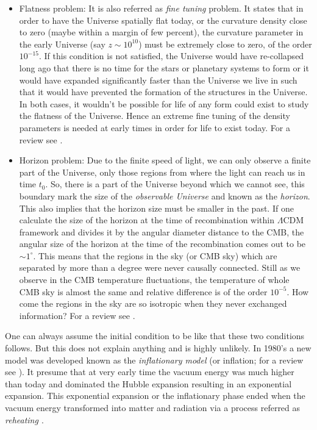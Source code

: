 \begin{itemize}
	\item Flatness problem: It is also referred as {\it fine tuning} problem. It 
				states that in order to have the Universe spatially flat today, or
				the curvature density close to zero (maybe within a margin of
				few percent), the curvature parameter in the early Universe (say 
				$z\sim10^{10}$) must be extremely close to zero, of the order $10^{-15}$.
				If this condition is not satisfied, the Universe would have re-collapsed
				long ago that there is no time for the stars or planetary systems to form
				or it would have expanded significantly faster than the Universe
				we live in such that it would have prevented the formation of the structures
				in the Universe. In both cases, it wouldn't be possible for life
				of any form could exist to study the flatness of the Universe. Hence
				an extreme fine tuning of the density parameters is needed at early
				times in order for life to exist today. For a review see \cite{2012PASA...29..395K}.

	\item Horizon problem: Due to the finite speed of light, we can only observe
				a finite part of the Universe, 
				only those regions from where the light can reach us
				in time $t_0$. So, there is a part of the Universe beyond which
				we cannot see, this boundary mark the size of the {\it observable Universe}
				and known as the {\it horizon}. This also implies that the horizon
				size must be smaller in the past. If one calculate the size of the
				horizon at the time of recombination within $\Lambda$CDM framework and
				divides it by the angular diameter distance to the CMB, the angular
				size of the horizon at the time of the recombination 
				comes out to be $\sim 1^{\circ}$. This means
				that the regions in the sky (or CMB sky) which are separated by 
				more than a degree were never causally connected. Still as
				we observe in the CMB temperature fluctuations, the temperature of
				whole CMB sky is almost the same and relative difference is of the 
				order $10^{-5}$. How come the regions in the sky are so isotropic
				when they never exchanged information? For a review see \cite{2012PASA...29..395K}.
\end{itemize}

One can always assume the initial condition to be like that these two conditions
follows. But this does not explain anything and is highly unlikely. In 1980's 
a new model was developed known as the {\it inflationary model} (or inflation;
for a review see \cite{2001hep.ph....1119B,2003hep.ph....4257T,2006RvMP...78..537B}). It presume
that at very early time the vacuum energy was much higher than today and dominated
the Hubble expansion resulting in an exponential expansion. This exponential
expansion or the inflationary phase ended when the vacuum energy transformed into
matter and radiation via a process referred as {\it reheating \citep{2006RvMP...78..537B}}.

